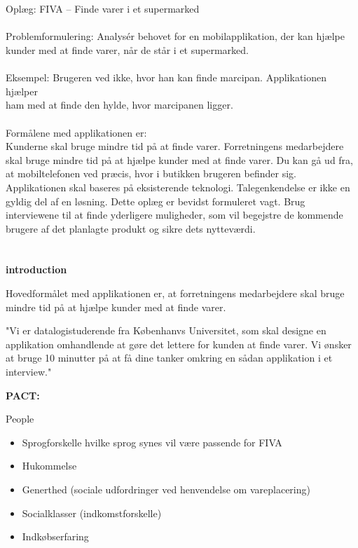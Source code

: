 \documentclass[12pt]{article}
\begin{document}
\section*{}
Oplæg: FIVA – Finde varer i et supermarked\\
\\
Problemformulering: Analysér behovet for en mobilapplikation, der kan hjælpe kunder med at finde varer, når de står i et
supermarked.\\
\\
Eksempel: Brugeren ved ikke, hvor han kan finde marcipan. Applikationen hjælper\\
ham med at finde den hylde, hvor marcipanen ligger.\\
\\
Formålene med applikationen er:\\
Kunderne skal bruge mindre tid på at finde varer.
Forretningens medarbejdere skal bruge mindre tid på at hjælpe kunder med at finde varer. Du kan gå ud fra, at mobiltelefonen ved præcis, hvor i butikken brugeren befinder sig. Applikationen skal baseres på eksisterende teknologi. Talegenkendelse er ikke en gyldig del af en løsning. Dette oplæg er bevidst formuleret vagt. Brug interviewene til at finde yderligere muligheder, som vil begejstre de kommende brugere af det planlagte produkt og sikre dets nytteværdi.

\section*{}

\textbf{introduction}

Hovedformålet med applikationen er, at forretningens medarbejdere skal bruge mindre tid på at hjælpe kunder med at finde varer.

"Vi er datalogistuderende fra Københanvs Universitet, som skal designe en applikation omhandlende at gøre det lettere for kunden at finde varer. Vi ønsker at bruge 10 minutter på at få dine tanker omkring en sådan applikation  i et interview."


\textbf{PACT:}

People
\begin{itemize}
\item Sprogforskelle hvilke sprog synes vil v\ae re passende for FIVA
\item Hukommelse 
\item Generthed (sociale udfordringer ved henvendelse om vareplacering)
\item Socialklasser (indkomstforskelle)
\item Indkøbserfaring
\end{itemize}
\end{document}
